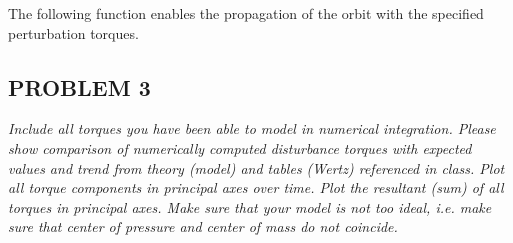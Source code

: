 The following function enables the propagation of the orbit with the specified perturbation torques.



\subsection{PROBLEM 3}
\textit{Include all torques you have been able to model in numerical integration. Please show comparison of numerically computed disturbance torques with expected values and trend from theory (model) and tables (Wertz) referenced in class. Plot all torque components in principal axes over time. Plot the resultant (sum) of all torques in principal axes. Make sure that your model is not too ideal, i.e. make sure that center of pressure and center of mass do not coincide.}

